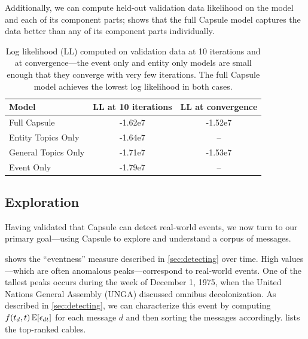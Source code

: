 Additionally, we can compute held-out validation data likelihood on the model and each of its component parts;  shows that the full Capsule model captures the data better than any of its component parts individually.
\begin{table}[bt]
\centering
\begin{tabular}{l c c}
\toprule
\textbf{Model} & \textbf{LL at 10 iterations} & \textbf{LL at convergence} \\
\midrule
Full Capsule & -1.62e7 & -1.52e7 \\
Entity Topics Only & -1.64e7 & -- \\
General Topics Only & -1.71e7 & -1.53e7 \\
Event Only & -1.79e7 & -- \\
\bottomrule
\end{tabular}
\caption{Log likelihood (LL) computed on validation data at 10 iterations and at convergence---the event only and entity only models are small enough that they converge with very few iterations. The full Capsule model achieves the lowest log likelihood in both cases.}
\label{table:cables:ll}
\end{table}

\subsection{Exploration}

Having validated that Capsule can detect real-world events, we now
turn to our primary goal---using Capsule to explore and understand a
corpus of messages.

 shows the ``eventness'' measure described in
\cref{sec:detecting} over time. High values---which are often
anomalous peaks---correspond to real-world events. One of the tallest
peaks occurs during the week of December 1, 1975, when the United
Nations General Assembly (UNGA) discussed omnibus decolonization. As
described in \cref{sec:detecting}, we can characterize this event by
computing $f(t_d, t)\,\mathbb{E}[\epsilon_{dt}]$ for each message $d$ and then
sorting the messages accordingly.  lists the
top-ranked cables.

